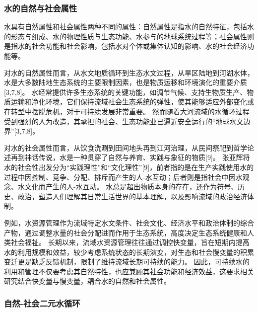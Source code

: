 

\subsubsection*{水的自然与社会属性}

水具有自然属性和社会属性两种不同的属性：自然属性是指水的自然特征，包括水的形态与组成、水的物理性质与生态功能、水参与的地球系统过程等；社会属性则是指水的社会功能和社会影响，包括水对个体或集体认知的影响、水的社会经济功能等。

对水的自然属性而言，从水文地质循环到生态水文过程，从旱区陆地到河湖水体，水是大多数陆地生态系统的主要限制因素，也是物质运移和环境演化的重要介质[3,7,8]。
水经常提供许多生态系统的关键功能，如调节气候、支持生物质生产、物质运输和净化环境，它们保持流域社会生态系统的弹性，使其能够适应外部变化或在转型中摆脱危机，对于可持续发展非常重要。
然而随着大河流域的水循环过程受到强烈的人为改造，其承担的社会、生态功能业已逼近安全运行的“地球水文边界”[3,7,8]。

对水的社会属性而言，从饮食洗涮到田间地头再到江河治理，从民间祭祀到哲学论述再到神话传说，水是一种贯穿了自然与养育、实践与象征的物质[9]。
张亚辉将水的社会性出发分为“实践理性”和“文化理性”[9]，前者指的是在生产实践使用水的过程中因控制、竞争、分配、排斥而产生的人-水互动；后者则是指社会中因水观念、水文化而产生的人-水互动。
水总是超出物质本身的存在，还作为符号、历史、政治，塑造人们理解其日常生活世界的基本理解，以及影响流域的政治经济体制\cite{ballestero2019}。

例如，水资源管理作为流域特定水文条件、社会文化、经济水平和政治体制的综合产物，通过调整水量的社会分配进而作用于生态系统，高度决定生态系统健康和人类社会福祉。
长期以来，流域水资源管理往往通过调控快变量，旨在短期内提高水的利用规模和效益，较少考虑系统状态的长期演变，对生态和社会慢变量的积累变迁更是缺乏反馈机制，限制了维持流域长期可持续的能力。
因此，可持续水的利用和管理不仅要考虑其自然特性，也应兼顾其社会功能和经济效益，这要求相关研究结合快变量与慢变量，耦合水的自然和社会属性。

\subsubsection*{自然-社会二元水循环}

